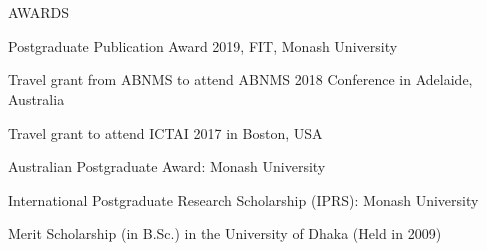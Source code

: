 \section{\faTrophy}{AWARDS}
\begin{itemize*}[noitemsep]
    \item Postgraduate Publication Award 2019, FIT, Monash University
    \item Travel grant from ABNMS to attend ABNMS 2018 Conference in Adelaide, Australia
    \item Travel grant to attend ICTAI 2017 in Boston, USA
    \item Australian Postgraduate Award: Monash University
    \item International Postgraduate Research Scholarship (IPRS): Monash University 
    \item Merit Scholarship (in B.Sc.) in the University of Dhaka (Held in 2009) 
\end{itemize*}